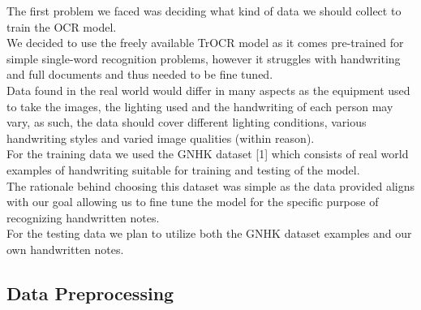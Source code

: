 \documentclass[twoside,a4paper]{article}
\begin{document}
The first problem we faced was deciding what kind of data we should collect to train the OCR model.\\
We decided to use the freely available TrOCR model as it comes pre-trained for simple single-word recognition problems, however it struggles with handwriting and full documents and thus needed to be fine tuned.\\
Data found in the real world would differ in many aspects as the equipment used to take the images, the lighting used and the handwriting of each person may vary, as such, the data should cover different lighting conditions, various handwriting styles and varied image qualities (within reason). \\
For the training data we used the GNHK dataset [1] which consists of real world examples of handwriting suitable for training and testing of the model. \\
The rationale behind choosing this dataset was simple as the data provided aligns with our goal allowing us to fine tune the model for the specific purpose of recognizing handwritten notes.\\
For the testing data we plan to utilize both the GNHK dataset examples and our own handwritten notes.

\pagebreak
\subsection{Data Preprocessing}
\end{document}
